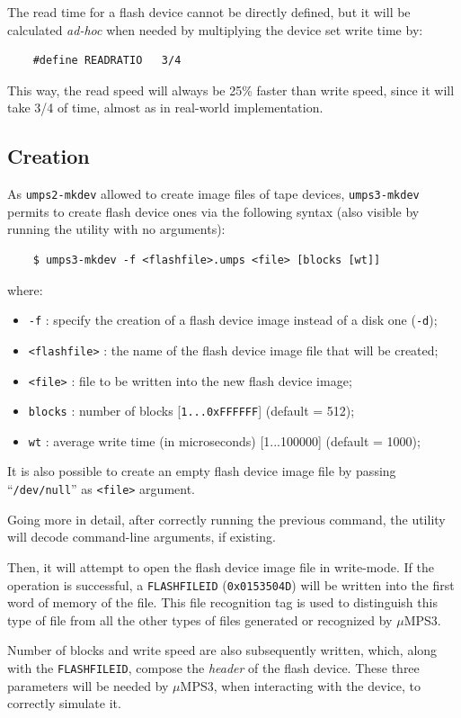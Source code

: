 \documentclass[12pt,a4paper,openright,twoside]{report}
\begin{document}
The read time for a flash device cannot be directly defined, but it will be calculated \textit{ad-hoc} when needed by multiplying the device set write time by:
\begin{verbatim}
	#define READRATIO   3/4
	\end{verbatim}
This way, the read speed will always be 25\% faster than write speed, since it will take 3/4 of time, almost as in real-world implementation.

\subsection{Creation}
As \texttt{umps2-mkdev} allowed to create image files of tape devices, \texttt{umps3-mkdev} permits to create flash device ones via the following syntax (also visible by running the utility with no arguments):
\begin{verbatim}
	$ umps3-mkdev -f <flashfile>.umps <file> [blocks [wt]]
	\end{verbatim}
where:
\begin{itemize}
	\item	\texttt{-f} : specify the creation of a flash device image instead of a disk one (\texttt{-d});
	\item	\texttt{<flashfile>} : the name of the flash device image file that will be created;
	\item	\texttt{<file>} : file to be written into the new flash device image;
	\item	\texttt{blocks} : number of blocks [\texttt{1...0xFFFFFF}] (default = 512);
	\item	\texttt{wt} : average write time (in microseconds) [1...100000] (default = 1000);
\end{itemize}
It is also possible to create an empty flash device image file by passing ``\texttt{/dev/null}'' as \texttt{<file>} argument.

Going more in detail, after correctly running the previous command, the utility will decode command-line arguments, if existing.

Then, it will attempt to open the flash device image file in write-mode.
If the operation is successful, a \texttt{FLASHFILEID} (\texttt{0x0153504D}) will be written into the first word of memory of the file.
This file recognition tag is used to distinguish this type of file from all the other types of files generated or recognized by $\mu$MPS3.

Number of blocks and write speed are also subsequently written, which, along with the \texttt{FLASHFILEID}, compose the \textit{header} of the flash device.
These three parameters will be needed by $\mu$MPS3, when interacting with the device, to correctly simulate it.
\end{document}
